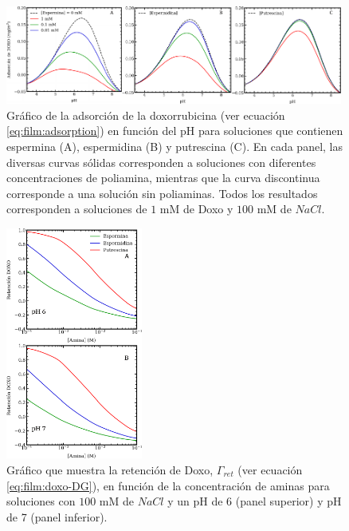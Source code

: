 \begin{figure}[!htb]
	\centering
	\includegraphics[width=0.99\textwidth]{Figures/graph-film/doxo_release-amines.pdf}
	\caption{Gr\'afico de la adsorci\'on de la doxorrubicina (ver ecuaci\'on \ref{eq:film:adsorption}) en funci\'on del pH para soluciones que contienen espermina (A), espermidina (B) y putrescina (C).
		En cada panel, las diversas curvas s\'olidas corresponden a soluciones con diferentes concentraciones de poliamina, mientras que la curva discontinua corresponde a una soluci\'on sin poliaminas. Todos los resultados corresponden a soluciones de $1$  mM de Doxo y $100$ mM de $NaCl$.}
	\label{fig:film:doxo-release}
\end{figure}



\begin{figure}[!htb]
	\centering
	\includegraphics[width=0.40\textwidth]{Figures/graph-film/DG67.pdf}
	\caption{Gr\'afico que muestra la retenci\'on de Doxo, $\Gamma_{ret}$ (ver ecuaci\'on \ref{eq:film:doxo-DG}), en funci\'on de la concentraci\'on de aminas para soluciones con $100$ mM de $NaCl$ y un pH de 6 (panel superior) y pH de 7 (panel inferior). }
	\label{fig:film:doxo-DG}
\end{figure}

